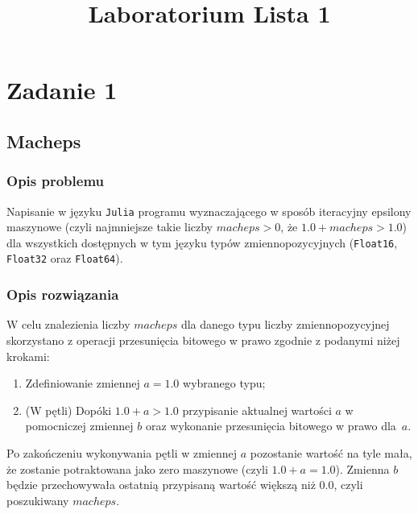 \documentclass{classrep}
\author{
  \studentinfo{Agata Jasionowska}{229726}
}
\title{Laboratorium \ppauza Lista 1}
\begin{document}
\maketitle

\section{Zadanie 1}
	\subsection{Macheps}
		\subsubsection{Opis problemu}
			Napisanie w języku \texttt{Julia} programu wyznaczającego w sposób iteracyjny epsilony 
			maszynowe (czyli najmniejsze takie liczby $macheps > 0$, że $1.0 + macheps > 1.0$) 
			dla wszystkich dostępnych w tym języku typów zmiennopozycyjnych (\texttt{Float16},
			\texttt{Float32} oraz \texttt{Float64}).
		\subsubsection{Opis rozwiązania}
			W celu znalezienia liczby $macheps$ dla danego typu liczby zmiennopozycyjnej
			skorzystano	z operacji przesunięcia bitowego w prawo zgodnie z podanymi niżej krokami:
			\begin{enumerate}
				\item Zdefiniowanie zmiennej $a = 1.0$ wybranego typu;
				\item (W pętli) Dopóki $1.0 + a > 1.0$ przypisanie aktualnej wartości $a$ w pomocniczej 
				zmiennej $b$ oraz wykonanie przesunięcia bitowego w prawo dla~$a$.
			\end{enumerate}
			Po zakończeniu wykonywania pętli w zmiennej $a$ pozostanie wartość na tyle
			mała, że zostanie potraktowana jako zero maszynowe (czyli $1.0 + a = 1.0$). Zmienna
			$b$ będzie przechowywała ostatnią przypisaną wartość większą niż $0.0$, czyli 
			poszukiwany $macheps$.
\end{document}
